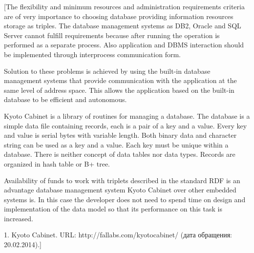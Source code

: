 \documentclass[conference]{IEEEtran}
\begin{document}
[The flexibility and minimum resources and administration requirements criteria are of very importance to choosing database providing information resources storage as triples. The database management systems as DB2, Oracle and SQL Server cannot fulfill requirements because after running the operation is performed as a separate process. Also application and DBMS interaction should be implemented through interprocess communication form.

Solution to these problems is achieved by using the built-in database management systems that provide communication with the application at the same level of address space. This allows the application based on the built-in database to be efficient and autonomous.

Kyoto Cabinet is a library of routines for managing a database. The database is a simple data file containing records, each is a pair of a key and a value. Every key and value is serial bytes with variable length. Both binary data and character string can be used as a key and a value. Each key must be unique within a database. There is neither concept of data tables nor data types. Records are organized in hash table or B+ tree. \cite{b1}

Availability of funds to work with triplets described in the standard RDF is an advantage database management system Kyoto Cabinet over other embedded systems is. In this case the developer does not need to spend time on design and implementation of the data model so that its performance on this task is increased.

1.	Kyoto Cabinet. URL: http://fallabs.com/kyotocabinet/ (дата обращения: 20.02.2014).]





%
%
\end{document}
